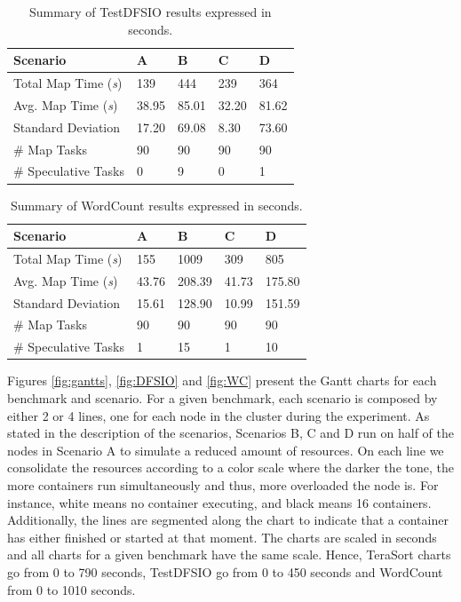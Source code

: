 \begin{table}[h!]
	\caption{Summary of TestDFSIO results expressed in seconds.} \label{tab:DFSIO}
	\begin{tabular*}{\hsize}{lllll} 
		\textbf{Scenario} & \textbf{A} & \textbf{B} & \textbf{C} & \textbf{D}\\
		\hline
		Total Map Time ({\it{s}}) & 139 & 444 & 239 & 364 \\
		Avg. Map Time ({\it{s}}) & 38.95 & 85.01 & 32.20 & 81.62 \\
		Standard Deviation & 17.20 & 69.08 & 8.30 & 73.60 \\
		\# Map Tasks & 90 & 90 & 90 & 90 \\
		\# Speculative Tasks & 0 & 9 & 0 & 1 \\
	\end{tabular*}
\end{table}


\begin{table}[h!]
	\caption{Summary of WordCount results expressed in seconds.} \label{tab:WC}
	\begin{tabular*}{\hsize}{lllll}
		\textbf{Scenario} & \textbf{A} & \textbf{B} & \textbf{C} & \textbf{D}\\
		\hline
		Total Map Time ({\it{s}}) & 155 & 1009 & 309 & 805 \\
		Avg. Map Time ({\it{s}}) & 43.76 & 208.39 & 41.73 & 175.80 \\
		Standard Deviation & 15.61 & 128.90 & 10.99 & 151.59 \\
		\# Map Tasks & 90 & 90 & 90 & 90 \\
		\# Speculative Tasks & 1 & 15 & 1 & 10 \\
	\end{tabular*}
\end{table}

Figures \ref{fig:gantts}, \ref{fig:DFSIO} and \ref{fig:WC} present the Gantt charts for each benchmark and scenario. For a given benchmark, each scenario is composed by either 2 or 4 lines, one for each node in the cluster during the experiment. As stated in the description of the scenarios, Scenarios B, C and D run on half of the nodes in Scenario A to simulate a reduced amount of resources. On each line we consolidate the resources according to a color scale where the darker the tone, the more containers run simultaneously and thus, more overloaded the node is. For instance, white means no container executing, and black means 16 containers. Additionally, the lines are segmented along the chart to indicate that a container has either finished or started at that moment. The charts are  scaled in seconds and all charts for a given benchmark have the same scale. Hence, TeraSort charts go from 0 to 790 seconds, TestDFSIO go from 0 to 450 seconds and WordCount from 0 to 1010 seconds.

